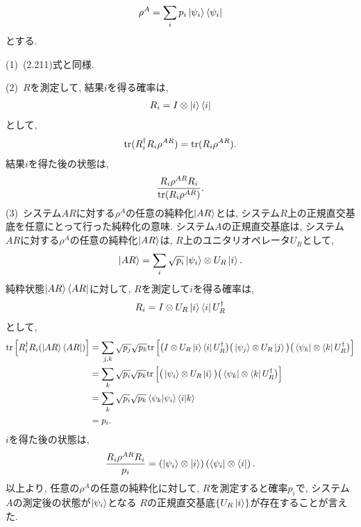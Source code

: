 \begin{ex}
    \label{ex2.82}
    \begin{align*}
        \rho^A = \sum_i p_i \ket{\psi_i} \bra{\psi_i}
    \end{align*}
    とする. \par
    (1)\
    (2.211)式と同様.
    \par
    (2)\
    $R$を測定して, 結果$i$を得る確率は,
    \begin{align*}
        R_i = I \otimes \ket{i} \bra{i}
    \end{align*}
    として,
    \begin{align*}
        \mathrm{tr}(R_i^\dagger R_i \rho^{AR}) = \mathrm{tr}(R_i \rho^{AR}).
    \end{align*}
    結果$i$を得た後の状態は,
    \begin{align*}
        \frac{R_i \rho^{AR} R_i}{\mathrm{tr} (R_i \rho^{AR})}.
    \end{align*}
    (3)\
    システム$AR$に対する$\rho^A$の任意の純粋化$\ket{AR}$とは, システム$R$上の正規直交基底を任意にとって行った純粋化の意味.
    システム$A$の正規直交基底は,
    システム$AR$に対する$\rho^A$の任意の純粋化$\ket{AR}$は, $R$上のユニタリオペレータ$U_R$として,
    \begin{align*}
        \ket{AR} = \sum_i \sqrt{p_i} \ket{\psi_i} \otimes U_R \ket{i}.
    \end{align*}
    純粋状態$\ket{AR} \bra{AR}$に対して, $R$を測定して$i$を得る確率は,
    \begin{align*}
        R_i = I \otimes U_R \ket{i} \bra{i} U_R^\dagger
    \end{align*}
    として,
    \begin{align*}
        \mathrm{tr}\left[R_i^\dagger R_i ( \ket{AR} \bra{AR})\right]
         & =
        \sum_{j,k} \sqrt{p_j} \sqrt{p_k}
        \mathrm{tr}
        \left[
            \big(
            I \otimes U_R \ket{i}\bra{i} U_R^\dagger
            \big)
            \big(
            \ket{\psi_j} \otimes U_R\ket{j}
            \big)
            \big(
            \bra{\psi_k} \otimes \bra{k} U_R^\dagger
            \big)
            \right]
        \\
         & =
        \sum_{k} \sqrt{p_i} \sqrt{p_k}
        \mathrm{tr}
        \left[
            \big(
            \ket{\psi_i} \otimes U_R\ket{i}
            \big)
            \big(
            \bra{\psi_k} \otimes \bra{k} U_R^\dagger
            \big)
            \right]
        \\
         & =
        \sum_{k} \sqrt{p_i} \sqrt{p_k} \braket{\psi_k | \psi_i} \braket{i|k} \\
         & =
        p_i.
    \end{align*}
    $i$を得た後の状態は,
    \begin{align*}
        \frac{R_i \rho^{AR} R_i}{p_i}=
        \left(
        \ket{\psi_i} \otimes \ket{i}
        \right)
        \left(
        \bra{\psi_i} \otimes \bra{i}
        \right).
    \end{align*}
    以上より, 任意の$\rho^A$の任意の純粋化に対して,
    $R$を測定すると確率$p_i$で, システム$A$の測定後の状態が$\ket{\psi_i}$となる
    $R$の正規直交基底$\{ U_R \ket{i} \}$が存在することが言えた.
\end{ex}

